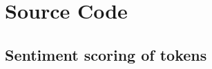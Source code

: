 \documentclass[12pt, twoside, a4paper, draft]{pancake-article}
\begin{document}



\section{Source Code}

\subsection{Sentiment scoring of tokens}
\inputminted{python}{../code/rq1_main.py}



\printbibliography[heading=bibintoc]
\end{document}
